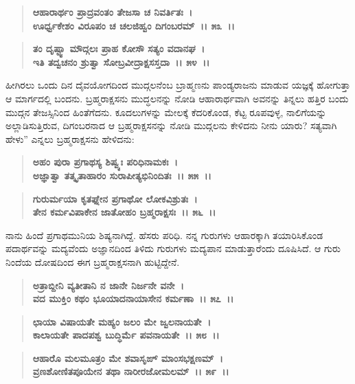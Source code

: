 \begin{verse}
\textbf{ಆಹಾರಾರ್ಥಂ ಪ್ರಾದ್ರವಂತಂ ತೇಜಸಾ ಚ ನಿವರ್ತಿತಃ~।}\\\textbf{ಊರ್ಧ್ವಕೇಶಂ ವಿರೂಪಂ ಚ ಚಲಜಿಹ್ವಂ ದಿಗಂಬರಮ್~।। ೫೩~।।}
\end{verse}

\begin{verse}
\textbf{ತಂ ದೃಷ್ಟ್ವಾ ಮೌದ್ಗಲಃ ಪ್ರಾಹ ಕೋಸೌ ಸತ್ಯಂ ವದಾನಘ~।}\\\textbf{ಇತಿ ತದ್ವಚನಂ ಶ್ರುತ್ವಾ ಸೋಬ್ರವೀದ್ರಾಕ್ಷಸಸ್ತದಾ~।। ೫೪~।।}
\end{verse}

ಹೀಗಿರಲು ಒಂದು ದಿನ ದೈವಯೋಗದಿಂದ ಮುದ್ಗಲನೆಂಬ ಬ್ರಾಹ್ಮಣನು ಪಾಂಡ್ಯರಾಜನು ಮಾಡುವ ಯಜ್ಞಕ್ಕೆ ಹೋಗುತ್ತಾ ಆ ಮಾರ್ಗದಲ್ಲಿ ಬಂದನು. ಬ್ರಹ್ಮರಾಕ್ಷಸನು ಮುದ್ಧಲನನ್ನು ನೋಡಿ ಆಹಾರಾರ್ಥವಾಗಿ ಅವನನ್ನು ತಿನ್ನಲು ಹತ್ತಿರ ಬಂದು ಮುದ್ಗನ ತೇಜಸ್ಸಿನಿಂದ ಹಿಂತೆಗೆದನು. ಕೂದಲುಗಳನ್ನು ಮೇಲಕ್ಕೆ ಕೆದರಿಕೊಂಡ, ಕೆಟ್ಟ ರೂಪವುಳ್ಳ, ನಾಲಿಗೆಯನ್ನು ಅಲ್ಲಾಡಿಸುತ್ತಿರುವ, ದಿಗಂಬರನಾದ ಆ ಬ್ರಹ್ಮರಾಕ್ಷಸನನ್ನು ನೋಡಿ ಮುದ್ಗಲನು ಕೇಳಿದನು ನೀನು ಯಾರು? ಸತ್ಯವಾಗಿ ಹೇಳು” ಎನ್ನಲು ಬ್ರಹ್ಮರಾಕ್ಷಸನು ಹೇಳಿದನು:

\begin{verse}
\textbf{ಅಹಂ ಪುರಾ ಪ್ರಗಾಥಸ್ಯ ಶಿಷ್ವ್ಯಃ ಪರಿಧಿನಾಮಕಃ~।}\\\textbf{ಅಜ್ಞಾತ್ವಾ ತತ್ಕೃತಾಹಾರಂ ಸುರಾಪೀತ್ಯಭಿನಿಂದಿತಃ~।। ೫೫~।। }
\end{verse}

\begin{verse}
\textbf{ಗುರುರ್ಮಯಾ ಕೃತಘ್ನೇನ ಪ್ರಗಾಥೋ ಲೋಕವಿಶ್ರುತಃ~।}\\\textbf{ತೇನ ಕರ್ಮವಿಪಾಕೇನ ಜಾತೋಹಂ ಬ್ರಹ್ಮರಾಕ್ಷಸಃ~।। ೫೬~।।}
\end{verse}

ನಾನು ಹಿಂದೆ ಪ್ರಗಾಥಮುನಿಯ ಶಿಷ್ಯನಾಗಿದ್ದೆ. ಹೆಸರು ಪರಿಧಿ. ನನ್ನ ಗುರುಗಳು ಆಹಾರಕ್ಕಾಗಿ ತಯಾರಿಸಿಕೊಂಡ ಪದಾರ್ಥವನ್ನು ಮದ್ಯವೆಂದು ಅಜ್ಞಾನದಿಂದ ತಿಳಿದು ಗುರುಗಳು ಮದ್ಯಪಾನ ಮಾಡುತ್ತಾರೆಂದು ದೂಷಿಸಿದೆ. ಆ ಗುರು ನಿಂದೆಯ ದೋಷದಿಂದ ಈಗ ಬ್ರಹ್ಮರಾಕ್ಷಸನಾಗಿ ಹುಟ್ಟಿದ್ದೇನೆ.

\begin{verse}
\textbf{ಅತ್ರಾಬ್ದೀನಿ ವ್ಯತೀತಾನಿ ನ ಜಾನೇ ನಿರ್ಜನೇ ವನೇ~।}\\\textbf{ವದ ಮುಕ್ತಿಂ ಕಥಂ ಭೂಯಾದನಾಯಾಸೇನ ಕರ್ಮಣಾ~।। ೫೭~।।} 
\end{verse}

\begin{verse}
\textbf{ಛಾಯಾ ವಿಷಾಯತೇ ಮಹ್ಯಂ ಜಲಂ ಮೇ ಜ್ವಲನಾಯತೇ~।}\\\textbf{ಕಾಲಾಯತೇ ಪಾದಪಶ್ವ ಬುದ್ಧಿರ್ಮೆ ಪವನಾಯತೇ~।। ೫೮~।। }
\end{verse}

\begin{verse}
\textbf{ಆಹಾರೊ ಮಲಮೂತ್ರಂ ಮೇ ಶವಾಸೃಙ್ ಮಾಂಸಭಕ್ಷಣಮ್~।}\\\textbf{ವ್ರಣಶೋಣಿತಪೂಯೇನ ತಥಾ ನಾರೀರಜೋಮಲಮ್~।। ೫೯~।। }
\end{verse}


